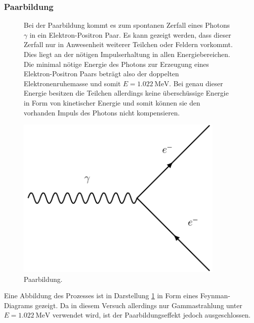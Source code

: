 \subsubsection{Paarbildung}
\begin{figure}
    \begin{minipage}{0.5\textwidth}
        Bei der Paarbildung kommt es zum spontanen Zerfall eines Photons $\gamma$ in ein Elektron-Positron Paar. Es kann gezeigt werden, dass dieser Zerfall nur in Anwesenheit weiterer Teilchen oder Feldern vorkommt. Dies liegt an der nötigen
        Impulserhaltung in allen Energiebereichen. Die minimal nötige Energie des Photons zur Erzeugung eines Elektron-Positron Paars beträgt also der doppelten Elektronenruhemasse und somit $E = \SI{1.022}{\mega\electronvolt}$. Bei genau dieser
        Energie besitzen die Teilchen allerdings keine überschüssige Energie in Form von kinetischer Energie und somit können sie den vorhanden Impuls des Photons nicht kompensieren.
    \end{minipage}
    \begin{minipage}{0.5\textwidth}
        \centering
        \includegraphics[width=0.9\textwidth]{bilder/paarbildung.pdf}
        \caption{Paarbildung.}
        \label{fig:lol1}
    \end{minipage}
    \end{figure}

Eine Abbildung des Prozesses ist in Darstellung \ref{fig:lol1} in Form eines
Feynman-Diagrams gezeigt. Da in diesem Versuch allerdings nur Gammastrahlung unter $E = \SI{1.022}{\mega\electronvolt}$ verwendet wird, ist der Paarbildungseffekt jedoch ausgeschlossen.
